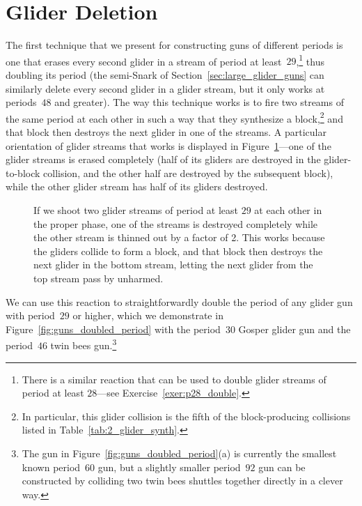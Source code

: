 \section{Glider Deletion}\label{sec:glider_deletion}

The first technique that we present for constructing guns of different periods is one that erases every second glider in a stream of period at least~$29$,\footnote{There is a similar reaction that can be used to double glider streams of period at least $28$---see Exercise~\ref{exer:p28_double}.} thus doubling its period (the semi-Snark of Section~\ref{sec:large_glider_guns} can similarly delete every second glider in a glider stream, but it only works at periods~$48$ and greater). The way this technique works is to fire two streams of the same period at each other in such a way that they synthesize a block,\footnote{In particular, this glider collision is the fifth of the block-producing collisions listed in Table~\ref{tab:2_glider_synth}.} and that block then destroys the next glider in one of the streams. A particular orientation of glider streams that works is displayed in Figure~\ref{fig:glider_delete}---one of the glider streams is erased completely (half of its gliders are destroyed in the glider-to-block collision, and the other half are destroyed by the subsequent block), while the other glider stream has half of its gliders destroyed.

\begin{figure}[!htb]
	\centering
	\caption{If we shoot two glider streams of period at least $29$ at each other in the proper phase, one of the streams is destroyed completely while the other stream is thinned out by a factor of 2. This works because the gliders collide to form a block, and that block then destroys the next glider in the bottom stream, letting the next glider from the top stream pass by unharmed.}\label{fig:glider_delete}
\end{figure}

We can use this reaction to straightforwardly double the period of any glider gun with period~$29$ or higher, which we demonstrate in Figure~\ref{fig:guns_doubled_period} with the period~$30$ Gosper glider gun and the period~$46$ twin bees gun.\footnote{The gun in Figure~\ref{fig:guns_doubled_period}(a) is currently the smallest known period~$60$ gun, but a slightly smaller period~$92$ gun can be constructed by colliding two twin bees shuttles together directly in a clever way.}

